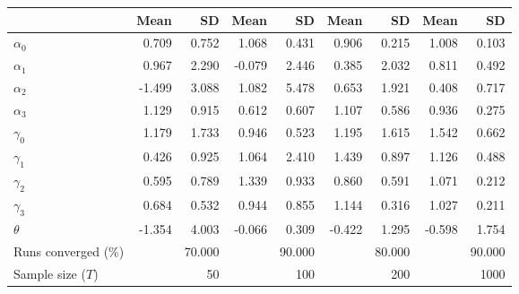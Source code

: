 
\begin{tabular}[t]{lrrrrrrrr}
\toprule
  & Mean & SD & Mean  & SD  & Mean   & SD   & Mean    & SD   \\
\midrule
$\alpha_{0}$ & 0.709 & 0.752 & 1.068 & 0.431 & 0.906 & 0.215 & 1.008 & 0.103\\
$\alpha_{1}$ & 0.967 & 2.290 & -0.079 & 2.446 & 0.385 & 2.032 & 0.811 & 0.492\\
$\alpha_{2}$ & -1.499 & 3.088 & 1.082 & 5.478 & 0.653 & 1.921 & 0.408 & 0.717\\
$\alpha_{3}$ & 1.129 & 0.915 & 0.612 & 0.607 & 1.107 & 0.586 & 0.936 & 0.275\\
$\gamma_{0}$ & 1.179 & 1.733 & 0.946 & 0.523 & 1.195 & 1.615 & 1.542 & 0.662\\
$\gamma_{1}$ & 0.426 & 0.925 & 1.064 & 2.410 & 1.439 & 0.897 & 1.126 & 0.488\\
$\gamma_{2}$ & 0.595 & 0.789 & 1.339 & 0.933 & 0.860 & 0.591 & 1.071 & 0.212\\
$\gamma_{3}$ & 0.684 & 0.532 & 0.944 & 0.855 & 1.144 & 0.316 & 1.027 & 0.211\\
$\theta$ & -1.354 & 4.003 & -0.066 & 0.309 & -0.422 & 1.295 & -0.598 & 1.754\\
Runs converged (\%) &  & 70.000 &  & 90.000 &  & 80.000 &  & 90.000\\
Sample size ($T$) &  & 50 &  & 100 &  & 200 &  & 1000\\
\bottomrule
\end{tabular}
